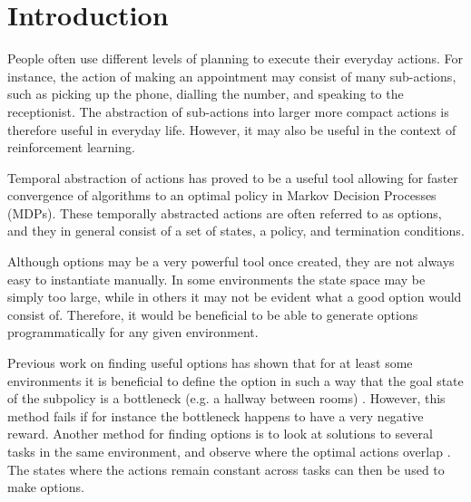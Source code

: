 \documentclass{acm_proc_article-sp}
\begin{document}


\section{Introduction}

People often use different levels of planning to execute their everyday actions. For instance, the action of making an appointment may consist of many sub-actions, such as picking up the phone, dialling the number, and speaking to the receptionist. The abstraction of sub-actions into larger more compact actions is therefore useful in everyday life. However, it may also be useful in the context of reinforcement learning.

Temporal abstraction of actions has proved to be a useful tool allowing for faster convergence of algorithms to an optimal policy in Markov Decision Processes (MDPs). These temporally abstracted actions are often referred to as options, and they in general consist of a set of states, a policy, and termination conditions. 

Although options may be a very powerful tool once created, they are not always easy to instantiate manually. In some environments the state space may be simply too large, while in others it may not be evident what a good option would consist of. Therefore, it would be beneficial to be able to generate options programmatically for any given environment.

Previous work on finding useful options has shown that for at least some environments it is beneficial to define the option in such a way that the goal state of the subpolicy is a bottleneck (e.g. a hallway between rooms) \cite{solwayoptimal}. However, this method fails if for instance the bottleneck happens to have a very negative reward. Another method for finding options is to look at solutions to several tasks in the same environment, and observe where the optimal actions overlap \cite{pickett2002policyblocks}. The states where the actions remain constant across tasks can then be used to make options.
\end{document}
